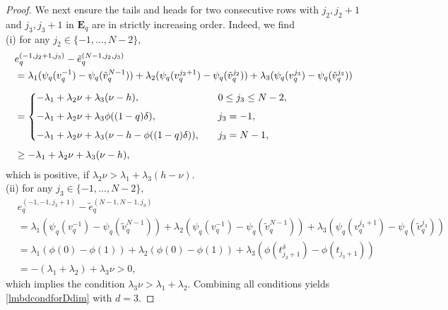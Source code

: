 \documentclass[10pt,reqno,final]{amsart}
\theoremstyle{remark}
\theoremstyle{definition}
\newcommand{\bs}[1]{\boldsymbol{#1}}
\begin{document}
\begin{proof}
We next ensure the tails and heads for two consecutive rows
with $j_2, j_2+1$ and $j_3, j_3+1$ in $\bs E_q$ are in strictly increasing order. Indeed, we find \\[4pt]
(i) for any $j_2\in \{-1,\ldots, N-2\}$,  
\begin{equation*}\label{bqheadtail3d}
\begin{split}
& e_q^{(-1,j_2+1,j_3)}-\tilde e_q^{(N-1,j_2,j_3)}\\
&=\lambda_1(\psi_q( v_q^{-1})-\psi_q(\tilde v_q^{N-1}))
+\lambda_2(\psi_q( v_q^{j_2+1})-\psi_q(\tilde v_q^{j_2}))+\lambda_3(\psi_q( v_q^{j_3})-\psi_q(\tilde v_q^{j_3}))
\\[6pt]&=
\begin{dcases}
-\lambda_1+\lambda_2\nu+\lambda_3(\nu-h), & 0\leq j_3\leq N-2,\\[4pt]
-\lambda_1+\lambda_2\nu+\lambda_3\phi((1-q)\delta),& j_3=-1,\\[4pt]
-\lambda_1+\lambda_2\nu+\lambda_3 (\nu-h-\phi((1-q)\delta)),\quad & j_3=N-1,
\end{dcases}\\[4pt]
&\geq-\lambda_1+\lambda_2\nu+\lambda_3(\nu-h),
\end{split}\end{equation*}
which is positive, if ${\lambda_2}\nu>{\lambda_1+\lambda_3(h-\nu)}$.\\[4pt]
(ii) for any  
$j_3\in \{-1,\ldots, N-2\}$, 
\begin{equation*}\begin{split}
& e_q^{(-1,-1,j_3+1)}-\tilde e_q^{(N-1,N-1,j_3)}\\
&=\lambda_1(\psi_q( v_q^{-1})-\psi_q(\tilde v_q^{N-1}))
+\lambda_2(\psi_q( v_q^{-1})-\psi_q(\tilde v_q^{N-1}))+\lambda_3(\psi_q( v_q^{j_3+1})-\psi_q(\tilde v_q^{j_3}))\\&
=\lambda_1(\phi(0)-\phi(1))
+\lambda_2(\phi(0)-\phi(1))+\lambda_3(\phi(t_{j_3+1}^{\delta})-\phi(t_{j_3+1}))\\
&=-(\lambda_1+\lambda_2)+\lambda_3\nu> 0,
\end{split}\end{equation*}
which implies the condition $\lambda_3\nu> \lambda_1+\lambda_2.$
Combining all conditions 
yields   \eqref{lmbdcondforDdim} with $d=3.$


\end{proof}
\end{document}
